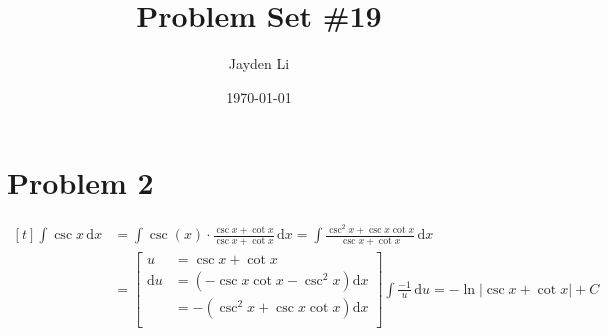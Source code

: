 \documentclass{article}
\title{\vspace*{-30pt}Problem Set \#19}
\author{Jayden Li}
\date{\today}
\newcommand*{\problem}[1]{\section*{Problem #1}}
\begin{document}
\fontsize{12pt}{12pt}\selectfont
\setlength{\abovedisplayskip}{0pt}
\maketitle

\problem{2}
\begin{mdframed}
	$\begin{aligned}[t]
		\int \csc x\,\mathrm{d}x
		&=\int \csc(x)\cdot \frac{\csc x+\cot x}{\csc x+\cot x}\,\mathrm{d}x
		=\int \frac{\csc^2x+\csc x\cot x}{\csc x+\cot x}\,\mathrm{d}x \\
		&=\left[\begin{aligned}
				u&=\csc x+\cot x \\
				\mathrm{d}u&=\left(-\csc x\cot x-\csc^2x\right)\mathrm{d}x \\
				&=-\left(\csc^2x+\csc x\cot x\right)\mathrm{d}x \\
		\end{aligned}\right]
		\int \frac{-1}{u}\,\mathrm{d}u
		=\boxed{-\ln|\csc x+\cot x|+C}
	\end{aligned}$
\end{mdframed}
\end{document}
